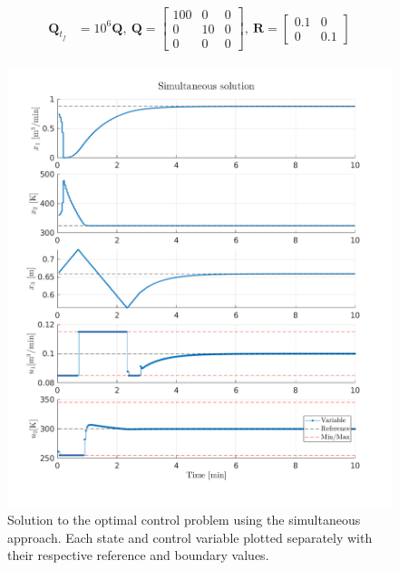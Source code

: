 \documentclass[letterpaper,12pt]{article}
\begin{document}
\begin{equation}
\begin{aligned}
	\mathbf{Q} _{t_f} &= 10^6 \mathbf{Q},\ \mathbf{Q} = \begin{bmatrix}
		100 & 0 & 0 \\ 0 & 10 & 0 \\ 0 & 0 & 0
	\end{bmatrix},\ \mathbf{R} = \begin{bmatrix}
		0.1 & 0 \\ 0 & 0.1
	\end{bmatrix}
\end{aligned}
\end{equation}

\begin{figure}[!htbp]
	\centering
	\includegraphics[width=1\textwidth]{img/3-sim.png}
	\caption{Solution to the optimal control problem using the simultaneous approach. Each state and control variable plotted separately with their respective reference and boundary values.}
	\label{img:3-sim}
\end{figure}



\printbibliography
\end{document}
